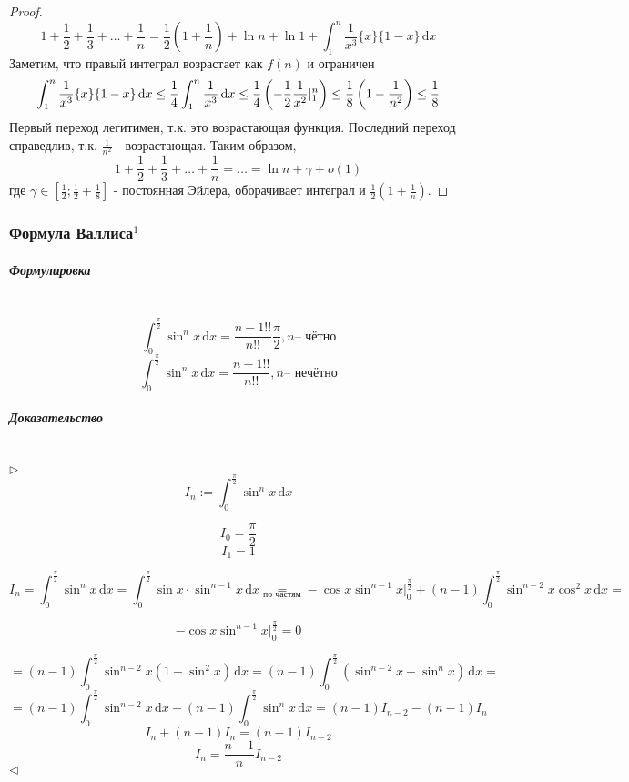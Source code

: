 \documentclass{article}
\def\D{\,\mathrm{d}}
\let\vanillasubparagraph\subparagraph
\renewcommand{\subparagraph}[1]{\vanillasubparagraph{#1}\mbox{}\\}
\begin{document}
\begin{proof}
\begin{equation*}
1 + \frac{1} {2} + \frac{1} {3} + \ldots + \frac{1} {n} = \frac{1} {2}\left(1 + \frac{1} {n}\right) + \ln{n} + \ln{1} + \int_1^n \frac{1}{x^3} \{x\} \{1 - x\} \D x
\end{equation*}
Заметим, что правый интеграл возрастает как $f(n)$ и ограничен
\begin{equation*}
\int_1^n \frac{1}{x^3} \{x\} \{1 - x\} \D x \leq \frac{1} {4}\int_1 ^n \frac{1} {x^3}\D x \leq \frac{1} {4} \left(-\frac{1} {2} \frac{1} {x^2} \arrowvert^n_1\right) \leq \frac{1} {8} \left(1 - \frac{1} {n^2}\right) \leq \frac{1} {8}
\end{equation*}
Первый переход легитимен, т.к. это возрастающая функция. Последний переход справедлив, т.к. $\frac{1} {n^2}$ - возрастающая.
Таким образом, 
\begin{equation}
1 + \frac{1}{2} + \frac{1}{3} + \ldots + \frac{1}{n} = \ldots = \ln{n} + \gamma + o(1)
\end{equation}
где $\gamma \in [\frac{1} {2}; \frac{1} {2} + \frac{1} {8}]$ - постоянная Эйлера, оборачивает интеграл и $\frac{1} {2}\left(1 + \frac{1} {n}\right)$. 
\end{proof}

\subsubsection{Формула Валлиса\texorpdfstring{$^1$}{}}\label{Валлис}
\subparagraph{Формулировка}
$$
\int_0^{\frac{\pi}{2}}\sin^n x \D x = \frac{n-1!!}{n!!}\frac{\pi}{2}, n\text{-- чётно}
$$
$$
\int_0^{\frac{\pi}{2}}\sin^n x \D x = \frac{n-1!!}{n!!}, n\text{-- нечётно}
$$

\subparagraph{Доказательство}
$\rhd$
$$
I_n := \int_0^{\frac{\pi}{2}}\sin^n x \D x
$$

$$
I_0 = \frac{\pi}{2}
$$
$$
I_1 = 1
$$

$$
I_n = \int_0^{\frac{\pi}{2}}\sin^n x \D x = \int_0^{\frac{\pi}{2}}\sin x \cdot \sin^{n-1}x \D x \underset{\text{по частям}}{=} -\cos x \sin^{n-1} x |_0^{\frac{\pi}{2}} + (n-1)\int_0^\frac{\pi}{2} \sin^{n-2}x \cos^2x \D x =
$$

$$
-\cos x \sin^{n-1} x |_0^{\frac{\pi}{2}} = 0
$$

$$
= (n-1)\int_0^\frac{\pi}{2} \sin^{n-2}x (1 - \sin^2x) \D x = (n-1)\int_0^\frac{\pi}{2} (\sin^{n-2}x - \sin^n x) \D x = 
$$
$$
= (n-1)\int_0^\frac{\pi}{2} \sin^{n-2}x \D x - (n-1)\int_0^\frac{\pi}{2} \sin^n x \D x = (n-1) I_{n-2} - (n-1) I_n 
$$
$$
I_n + (n-1)I_n = (n-1)I_{n-2}
$$
$$
I_n = \frac{n-1}{n}I_{n-2}
$$
$\lhd$
\end{document}
